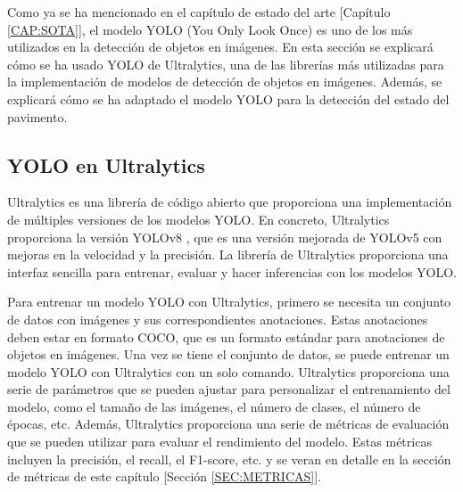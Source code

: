 Como ya se ha mencionado en el capítulo de estado del arte [Capítulo \ref{CAP:SOTA}], el modelo YOLO (You Only Look Once) es uno de los más utilizados en la detección de objetos en imágenes. En esta sección se explicará cómo se ha usado YOLO de Ultralytics, una de las librerías más utilizadas para la implementación de modelos de detección de objetos en imágenes. Además, se explicará cómo se ha adaptado el modelo YOLO para la detección del estado del pavimento.

\subsection{YOLO en Ultralytics}

Ultralytics es una librería de código abierto que proporciona una implementación de múltiples versiones de los modelos YOLO. En concreto, Ultralytics proporciona la versión YOLOv8 \cite{yolov8_ultralytics}, que es una versión mejorada de YOLOv5 con mejoras en la velocidad y la precisión. La librería de Ultralytics proporciona una interfaz sencilla para entrenar, evaluar y hacer inferencias con los modelos YOLO.

Para entrenar un modelo YOLO con Ultralytics, primero se necesita un conjunto de datos con imágenes y sus correspondientes anotaciones. Estas anotaciones deben estar en formato COCO, que es un formato estándar para anotaciones de objetos en imágenes. Una vez se tiene el conjunto de datos, se puede entrenar un modelo YOLO con Ultralytics con un solo comando. Ultralytics proporciona una serie de parámetros que se pueden ajustar para personalizar el entrenamiento del modelo, como el tamaño de las imágenes, el número de clases, el número de épocas, etc. Además, Ultralytics proporciona una serie de métricas de evaluación que se pueden utilizar para evaluar el rendimiento del modelo. Estas métricas incluyen la precisión, el recall, el F1-score, etc. y se veran en detalle en la sección de métricas de este capítulo [Sección \ref{SEC:METRICAS}].
